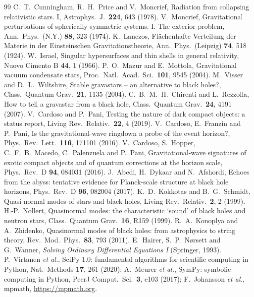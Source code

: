\documentclass[11pt,a4paper]{article}
\numberwithin{equation}{section}
\begin{document}
\begin{thebibliography}{99}
 C.~T.~Cunningham, R.~H.~Price and V.~Moncrief, Radiation from collapsing relativistic stars. I, Astrophys.\ J.\ \textbf{224}, 643 (1978).
 V.~Moncrief, Gravitational perturbations of spherically symmetric systems. I. The exterior problem, Ann.\ Phys.\ (N.Y.) \textbf{88}, 323 (1974).
 K.~Lanczos, Fl\"achenhafte Verteilung der Materie in der Einsteinschen Gravitationstheorie, Ann.\ Phys.\ (Leipzig) \textbf{74}, 518 (1924).
 W.~Israel, Singular hypersurfaces and thin shells in general relativity, Nuovo Cimento B \textbf{44}, 1 (1966).
 P.~O.~Mazur and E.~Mottola, Gravitational vacuum condensate stars, Proc.\ Natl.\ Acad.\ Sci.\ \textbf{101}, 9545 (2004).
 M.~Visser and D.~L.~Wiltshire, Stable gravastars -- an alternative to black holes?, Class.\ Quantum Grav.\ \textbf{21}, 1135 (2004).
 C.~B.~M.~H.~Chirenti and L.~Rezzolla, How to tell a gravastar from a black hole, Class.\ Quantum Grav.\ \textbf{24}, 4191 (2007).
 V.~Cardoso and P.~Pani, Testing the nature of dark compact objects: a status report, Living Rev.\ Relativ.\ \textbf{22}, 4 (2019).
 V.~Cardoso, E.~Franzin and P.~Pani, Is the gravitational-wave ringdown a probe of the event horizon?, Phys.\ Rev.\ Lett.\ \textbf{116}, 171101 (2016).
 V.~Cardoso, S.~Hopper, C.~F.~B.~Macedo, C.~Palenzuela and P.~Pani, Gravitational-wave signatures of exotic compact objects and of quantum corrections at the horizon scale, Phys.\ Rev.\ D \textbf{94}, 084031 (2016).
 J.~Abedi, H.~Dykaar and N.~Afshordi, Echoes from the abyss: tentative evidence for Planck-scale structure at black hole horizons, Phys.\ Rev.\ D \textbf{96}, 082004 (2017).
 K.~D.~Kokkotas and B.~G.~Schmidt, Quasi-normal modes of stars and black holes, Living Rev.\ Relativ.\ \textbf{2}, 2 (1999).
 H.-P.~Nollert, Quasinormal modes: the characteristic `sound' of black holes and neutron stars, Class.\ Quantum Grav.\ \textbf{16}, R159 (1999).
 R.~A.~Konoplya and A.~Zhidenko, Quasinormal modes of black holes: from astrophysics to string theory, Rev.\ Mod.\ Phys.\ \textbf{83}, 793 (2011).
 E.~Hairer, S.~P.~N{\o}rsett and G.~Wanner, \emph{Solving Ordinary Differential Equations I} (Springer, 1993).
 P.~Virtanen \emph{et al.}, SciPy 1.0: fundamental algorithms for scientific computing in Python, Nat.\ Methods \textbf{17}, 261 (2020); A.~Meurer \emph{et al.}, SymPy: symbolic computing in Python, PeerJ Comput.\ Sci.\ \textbf{3}, e103 (2017); F.~Johansson \emph{et al.}, mpmath, \url{https://mpmath.org}.
\end{thebibliography}
\end{document}

